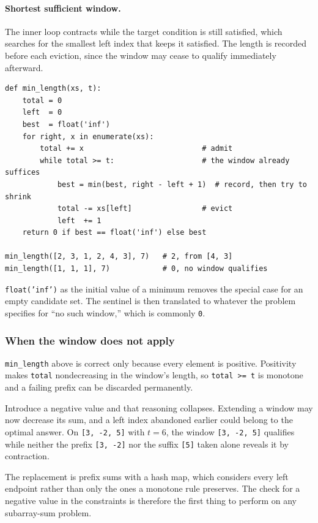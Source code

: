 \paragraph{Shortest sufficient window.} The inner loop contracts while the
target condition is still satisfied, which searches for the smallest left index
that keeps it satisfied. The length is recorded before each eviction, since the
window may cease to qualify immediately afterward.

\begin{lstlisting}[style=python, caption={Shortest subarray with sum at least t, over positive values}]
def min_length(xs, t):
    total = 0
    left  = 0
    best  = float('inf')
    for right, x in enumerate(xs):
        total += x                           # admit
        while total >= t:                    # the window already suffices
            best = min(best, right - left + 1)  # record, then try to shrink
            total -= xs[left]                # evict
            left  += 1
    return 0 if best == float('inf') else best

min_length([2, 3, 1, 2, 4, 3], 7)   # 2, from [4, 3]
min_length([1, 1, 1], 7)            # 0, no window qualifies
\end{lstlisting}

\texttt{float('inf')} as the initial value of a minimum removes the special case
for an empty candidate set. The sentinel is then translated to whatever the
problem specifies for ``no such window,'' which is commonly \texttt{0}.

\subsubsection*{When the window does not apply}

\begin{keybox}
\texttt{min\_length} above is correct only because every element is positive.
Positivity makes \texttt{total} nondecreasing in the window's length, so
\texttt{total >= t} is monotone and a failing prefix can be discarded
permanently.

Introduce a negative value and that reasoning collapses. Extending a window may
now decrease its sum, and a left index abandoned earlier could belong to the
optimal answer. On \texttt{[3, -2, 5]} with $t = 6$, the window
\texttt{[3, -2, 5]} qualifies while neither the prefix \texttt{[3, -2]} nor the
suffix \texttt{[5]} taken alone reveals it by contraction.

The replacement is prefix sums with a hash map, which considers every left
endpoint rather than only the ones a monotone rule preserves. The check for a
negative value in the constraints is therefore the first thing to perform on any
subarray-sum problem.
\end{keybox}

